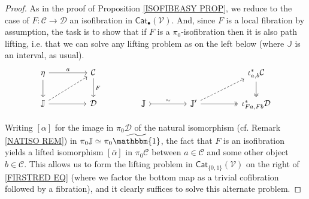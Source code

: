 \documentclass[a4paper,10pt
 ,final
]{article}%
\numberwithin{equation}{section}
\numberwithin{figure}{section}
\theoremstyle{definition} %
\newcommand{\V}{\ensuremath{\mathcal V}}
\newcommand{\1}{\ensuremath{\mathbbm 1}}%
\begin{document}
\begin{proof}
	As in the proof of Proposition \ref{ISOFIBEASY PROP},
	we reduce to the case of $F \colon \mathcal{C} \to \mathcal{D}$
	an isofibration in $\mathsf{Cat}_{\bullet}(\V)$.
	And, since $F$ is a local fibration by assumption, 
	the task is to show that if
	$F$ is a $\pi_0$-isofibration then it is also path lifting, 
	i.e. that we can solve any lifting problem as on the left below
	(where $\mathbb{J}$ is an interval, as usual).
	\begin{equation}\label{FIRSTRED EQ}
	\begin{tikzcd}[column sep = 45pt]
	\eta \ar{d} \ar{r}{a}
	&
	\mathcal{C} \ar{d}{F}
	&%
	&
	&
	\iota^{\**}_{a,b} \mathcal{C} \ar[twoheadrightarrow]{d}
	\\
	\mathbb{J} \ar{r} \ar[dashed]{ru}
	&
	\mathcal{D}
	&%
	\mathbb{J} \ar[rightarrowtail]{r}{\sim}
	&
	\mathbb{J}' \ar[twoheadrightarrow]{r} \ar[dashed]{ru}
	&
	\iota^{\**}_{Fa,Fb} \mathcal{D}
	\end{tikzcd}
	\end{equation}
	
	Writing $[\alpha]$ for the image in
	$\pi_0 \mathcal{D}$
	of the natural isomorphism (cf. Remark \ref{NATISO REM})
	in $\pi_0 \mathbb{J} \simeq \pi_0 \widetilde{\mathbbm{1}}$,
	the fact that $F$ is an isofibration
	yields a lifted isomorphism
	$[\bar{\alpha}]$ in $\pi_0 \mathcal{C}$
	between $a \in \mathcal{C}$ and some other object $b \in \mathcal{C}$.
	This allows us to form the lifting problem 
	in $\mathsf{Cat}_{\{0,1\}}(\V)$
	on the right of 
	\eqref{FIRSTRED EQ}
	(where we factor the bottom map as a trivial cofibration followed by a fibration),
	and it clearly suffices to solve this alternate problem.
	

\end{proof}
\end{document}
